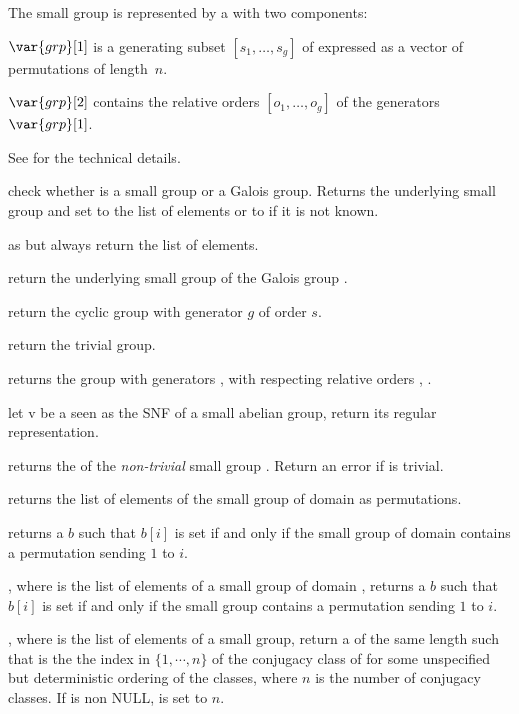 The small group  is represented by a  with two
components:

$\var{grp}[1]$ is a generating subset $[s_1,\ldots,s_g]$ of 
expressed as a vector of permutations of length~$n$.

$\var{grp}[2]$ contains the relative orders $[o_1,\ldots,o_g]$ of
the generators $\var{grp}[1]$.

See  for the technical details.

 check whether  is a
small group or a Galois group. Returns the underlying small
group and set  to the list of elements or to  if it is not
known.

 as  but always
return the list of elements.

 return the underlying small group of the
Galois group .

 return the cyclic group with generator
$g$ of order $s$.

 return the trivial group.

 returns the group
with generators ,  with respecting relative orders ,
.

 let v be a  seen as the SNF of
a small abelian group, return its regular representation.

 returns the  of the
\emph{non-trivial} small group . Return an error if  is
trivial.

 returns the list of elements of the
small group  of domain  as permutations.

 returns a  $b$ such that
$b[i]$ is set if and only if the small group  of domain 
contains a permutation sending $1$ to $i$.

, where  is the list of
elements of a small group of domain , returns a  $b$ such that
$b[i]$ is set if and only if the small group contains a permutation sending $1$
to $i$.

, where  is the list of
elements of a small group, return a   of the same length
such that  is the the index in $\{1,\cdots,n\}$  of the conjugacy
class of  for some unspecified but deterministic ordering of the
classes, where $n$ is the number of conjugacy classes. If  is non
NULL,  is set to $n$.

